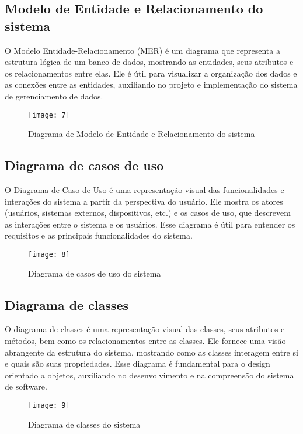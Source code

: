 \subsection{Modelo de Entidade e Relacionamento do sistema \cite{26}}

O Modelo Entidade-Relacionamento (MER) é um diagrama que representa a estrutura lógica de um banco de dados, mostrando as entidades, seus atributos e os relacionamentos entre elas. Ele é útil para visualizar a organização dos dados e as conexões entre as entidades, auxiliando no projeto e implementação do sistema de gerenciamento de dados.

\begin{figure}[h]
  \caption{Diagrama de Modelo de Entidade e Relacionamento do sistema}
  \centering
  \texttt{[image: 7]}
\end{figure}
\FloatBarrier

\clearpage
\subsection{Diagrama de casos de uso \cite{27}}

O Diagrama de Caso de Uso é uma representação visual das funcionalidades e interações do sistema a partir da perspectiva do usuário. Ele mostra os atores (usuários, sistemas externos, dispositivos, etc.) e os casos de uso, que descrevem as interações entre o sistema e os usuários. Esse diagrama é útil para entender os requisitos e as principais funcionalidades do sistema.

\begin{figure}[h]
  \caption{Diagrama de casos de uso do sistema}
  \centering
  \texttt{[image: 8]}
\end{figure}
\FloatBarrier

\clearpage
\subsection{Diagrama de classes \cite{27}}

O diagrama de classes é uma representação visual das classes, seus atributos e métodos, bem como os relacionamentos entre as classes. Ele fornece uma visão abrangente da estrutura do sistema, mostrando como as classes interagem entre si e quais são suas propriedades. Esse diagrama é fundamental para o design orientado a objetos, auxiliando no desenvolvimento e na compreensão do sistema de software.

\begin{figure}[h]
  \caption{Diagrama de classes do sistema}
  \centering
  \texttt{[image: 9]}
\end{figure}
\FloatBarrier

